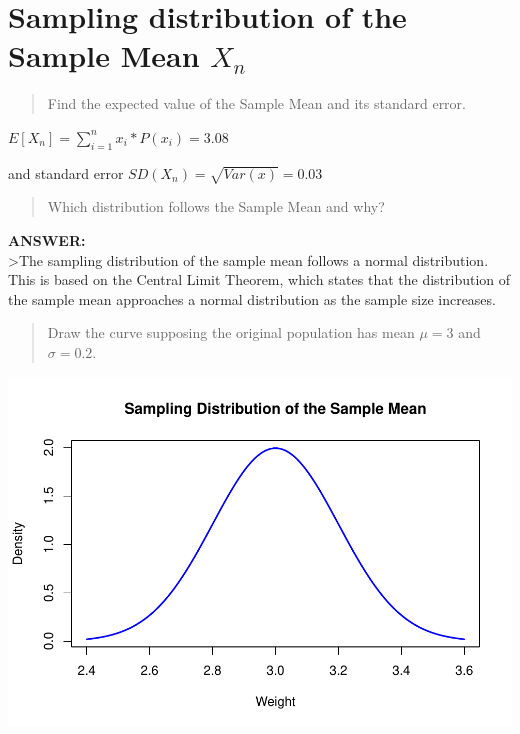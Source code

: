 \documentclass[
]{article}
\begin{document}
\newpage

\hypertarget{sampling-distribution-of-the-sample-mean-x_n}{%
\section{\texorpdfstring{Sampling distribution of the Sample Mean
\(X_{n}\)}{Sampling distribution of the Sample Mean X\_\{n\}}}\label{sampling-distribution-of-the-sample-mean-x_n}}

\begin{quote}
Find the expected value of the Sample Mean and its standard error.
\end{quote}

\(E[X_{n}] = \sum_{i=1}^{n}{x_i * P(x_i)} = 3.08\)

and standard error \(SD(X_{n}) = \sqrt{Var(x)} = 0.03\)

\vspace{2cm}

\begin{quote}
Which distribution follows the Sample Mean and why?
\end{quote}

\textbf{ANSWER:}\\
\vspace{2cm} \textgreater The sampling distribution of the sample mean
follows a normal distribution. This is based on the Central Limit
Theorem, which states that the distribution of the sample mean
approaches a normal distribution as the sample size increases.

\vspace{2cm}

\begin{quote}
Draw the curve supposing the original population has mean \(\mu = 3\)
and \(\sigma = 0.2\).
\end{quote}

\includegraphics{final_work_stu_files/figure-latex/unnamed-chunk-5-1.pdf}
\end{document}
